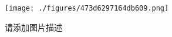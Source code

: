 
\begin{figure}[ht]
\centering
\texttt{[image: ./figures/473d6297164db609.png]}
\caption{请添加图片描述} \label{fig_test7g_1}
\end{figure}
